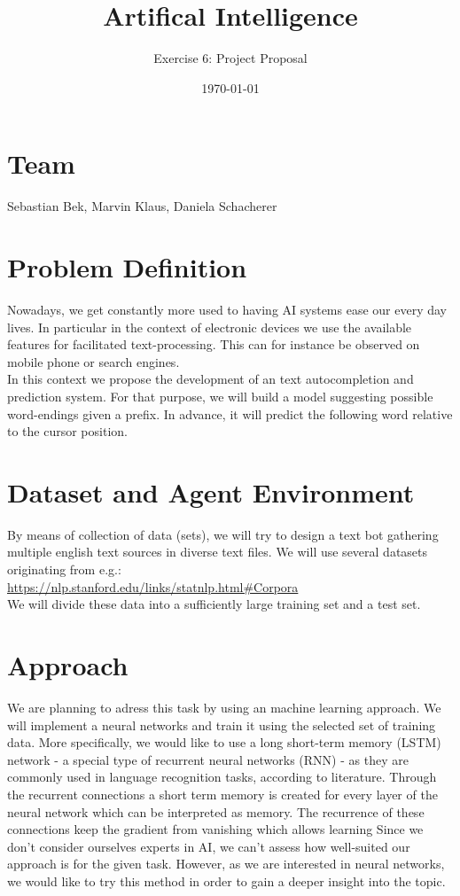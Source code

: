 \documentclass[a4paper,11pt]{scrartcl}
\title{\vspace{-1cm}Artifical Intelligence}
\subtitle{Exercise 6: Project Proposal} \date{\today}
\begin{document}
\maketitle

\section*{Team}
Sebastian Bek, Marvin Klaus, Daniela Schacherer
\section*{Problem Definition}

Nowadays, we get constantly more used to having AI systems ease our every day lives. In particular in the context of electronic devices we use the available features for facilitated text-processing. This can for instance be observed on mobile phone or search engines. \\
In this context we propose the development of an text autocompletion and prediction system. For that purpose, we will build a model suggesting possible word-endings given a prefix. In advance, it will predict the following word relative to the cursor position.
 
\section*{Dataset and Agent Environment}

By means of collection of data (sets), we will try to design a text bot gathering multiple english text sources in diverse text files. We will use several datasets originating from e.g.:\\
\url{https://nlp.stanford.edu/links/statnlp.html#Corpora}\\
We will divide these data into a sufficiently large training set and a test set. 

\section*{Approach}

We are planning to adress this task by using an machine learning approach. We will implement a neural networks and train it using the selected set of training data. More specifically, we would like to use a long short-term memory (LSTM) network - a special type of recurrent neural networks (RNN) - as they are commonly used in language recognition tasks, according to literature. Through the recurrent connections a short term memory is created for every layer of the neural network which can be interpreted as memory. The recurrence of these connections keep the gradient from vanishing which allows learning 
Since we don't consider ourselves experts in AI, we can't assess how well-suited our approach is for the given task. However, as we are interested in neural networks, we would like to try this method in order to gain a deeper insight into the topic.\\
\end{document}
